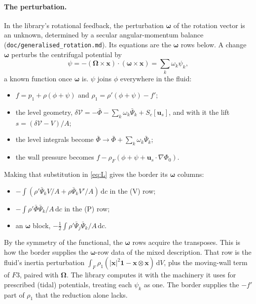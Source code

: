 \documentclass[11pt]{article}
\theoremstyle{definition}
\theoremstyle{remark}
\newcommand{\bu}{\mathbf{u}}
\newcommand{\bx}{\mathbf{x}}
\newcommand{\bOmega}{\boldsymbol{\Omega}}
\newcommand{\bomega}{\boldsymbol{\omega}}
\newcommand{\dV}{\,\mathrm{d}V}
\newcommand{\dc}{\,\mathrm{d}c}
\newcommand{\Vol}{\mathcal V}
\newcommand{\code}[1]{\texttt{#1}}
\begin{document}
\paragraph{The perturbation.} In the library's rotational feedback, the
perturbation $\bomega$ of the rotation vector is an unknown,
determined by a secular angular-momentum balance
(\code{doc/generalised\_rotation.md}). Its equations are the
$\bomega$ rows below. A change $\bomega$ perturbs the centrifugal
potential by
\begin{equation*}
  \psi = -(\bOmega\times\bx)\cdot(\bomega\times\bx) = \sum_k\omega_k\psi_k ,
\end{equation*}
a known function once $\bomega$ is. $\psi$ joins $\phi$ everywhere in
the fluid:
\begin{itemize}
\item $f = p_1 + \rho(\phi + \psi)$ and $\rho_1 = \rho'(\phi +
  \psi) - f'$;
\item the level geometry, $\delta\Vol = -\bar\Phi - \sum_k\omega_k\bar\Psi_k
  + S_c[\bu_s]$, and with it the lift $s = (\delta\Vol - V)/A$;
\item the level integrals become $\bar\Phi \to \bar\Phi +
  \sum_k\omega_k\bar\Psi_k$;
\item the wall pressure becomes $f - \rho_F(\phi + \psi +
  \bu_s\cdot\nabla\Phi_0)$.
\end{itemize}
Making that substitution in \eqref{eq:L} gives the border its
$\bomega$ columns:
\begin{itemize}
\item $-\int(\rho'\bar\Psi_kV/A + \rho\bar\Psi_kV'/A)\dc$ in the
  (V) row;
\item $-\int\rho'\bar\Phi\bar\Psi_k/A\dc$ in the (P) row;
\item an $\bomega$ block, $-\tfrac12\int\rho'\bar\Psi_j\bar\Psi_k/A\dc$.
\end{itemize}
By the symmetry of the functional, the $\bomega$ rows acquire the
transposes. This is how the border supplies the $\bomega$-row data of
the mixed description. That row is the fluid's inertia perturbation
$\int_F\rho_1(|\bx|^2\mathbf 1 - \bx\otimes\bx)\dV$, plus the
moving-wall term of $F3$, paired with $\bOmega$. The library computes it with
the machinery it uses for prescribed (tidal) potentials, treating each
$\psi_k$ as one. The border supplies the $-f'$ part of $\rho_1$ that
the reduction alone lacks.
\end{document}
